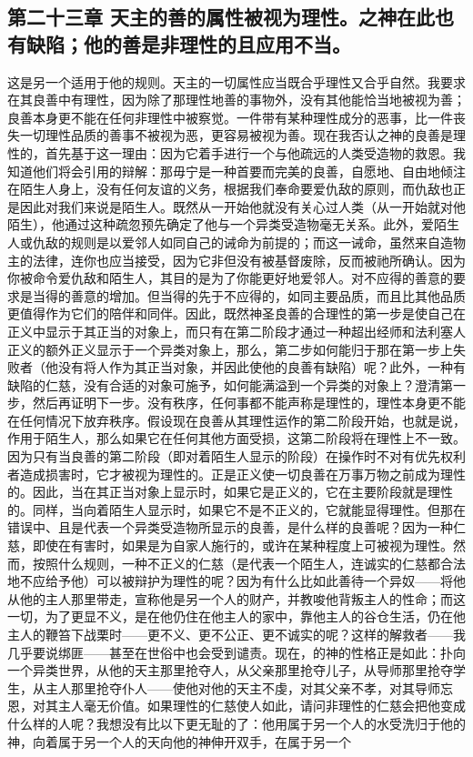 
\subsection{第二十三章 天主的善的属性被视为理性。之神在此也有缺陷；他的善是非理性的且应用不当。}

这是另一个适用于他的规则。天主的一切属性应当既合乎理性又合乎自然。我要求在其良善中有理性，因为除了那理性地善的事物外，没有其他能恰当地被视为善；良善本身更不能在任何非理性中被察觉。一件带有某种理性成分的恶事，比一件丧失一切理性品质的善事不被视为恶，更容易被视为善。现在我否认之神的良善是理性的，首先基于这一理由：因为它着手进行一个与他疏远的人类受造物的救恩。我知道他们将会引用的辩解：那毋宁是一种首要而完美的良善，自愿地、自由地倾注在陌生人身上，没有任何友谊的义务，根据我们奉命要爱仇敌的原则，而仇敌也正是因此对我们来说是陌生人。既然从一开始他就没有关心过人类（从一开始就对他陌生），他通过这种疏忽预先确定了他与一个异类受造物毫无关系。此外，爱陌生人或仇敌的规则是以爱邻人如同自己的诫命为前提的；而这一诫命，虽然来自造物主的法律，连你也应当接受，因为它非但没有被基督废除，反而被祂所确认。因为你被命令爱仇敌和陌生人，其目的是为了你能更好地爱邻人。对不应得的善意的要求是当得的善意的增加。但当得的先于不应得的，如同主要品质，而且比其他品质更值得作为它们的陪伴和同伴。因此，既然神圣良善的合理性的第一步是使自己在正义中显示于其正当的对象上，而只有在第二阶段才通过一种超出经师和法利塞人正义的额外正义显示于一个异类对象上，那么，第二步如何能归于那在第一步上失败者（他没有将人作为其正当对象，并因此使他的良善有缺陷）呢？此外，一种有缺陷的仁慈，没有合适的对象可施予，如何能满溢到一个异类的对象上？澄清第一步，然后再证明下一步。没有秩序，任何事都不能声称是理性的，理性本身更不能在任何情况下放弃秩序。假设现在良善从其理性运作的第二阶段开始，也就是说，作用于陌生人，那么如果它在任何其他方面受损，这第二阶段将在理性上不一致。因为只有当良善的第二阶段（即对着陌生人显示的阶段）在操作时不对有优先权利者造成损害时，它才被视为理性的。正是正义使一切良善在万事万物之前成为理性的。因此，当在其正当对象上显示时，如果它是正义的，它在主要阶段就是理性的。同样，当向着陌生人显示时，如果它不是不正义的，它就能显得理性。但那在错误中、且是代表一个异类受造物所显示的良善，是什么样的良善呢？因为一种仁慈，即使在有害时，如果是为自家人施行的，或许在某种程度上可被视为理性。然而，按照什么规则，一种不正义的仁慈（是代表一个陌生人，连诚实的仁慈都合法地不应给予他）可以被辩护为理性的呢？因为有什么比如此善待一个异奴——将他从他的主人那里带走，宣称他是另一个人的财产，并教唆他背叛主人的性命；而这一切，为了更显不义，是在他仍住在他主人的家中，靠他主人的谷仓生活，仍在他主人的鞭笞下战栗时——更不义、更不公正、更不诚实的呢？这样的解救者——我几乎要说绑匪——甚至在世俗中也会受到谴责。现在，的神的性格正是如此：扑向一个异类世界，从他的天主那里抢夺人，从父亲那里抢夺儿子，从导师那里抢夺学生，从主人那里抢夺仆人——使他对他的天主不虔，对其父亲不孝，对其导师忘恩，对其主人毫无价值。如果理性的仁慈使人如此，请问非理性的仁慈会把他变成什么样的人呢？我想没有比以下更无耻的了：他用属于另一个人的水受洗归于他的神，向着属于另一个人的天向他的神伸开双手，在属于另一个